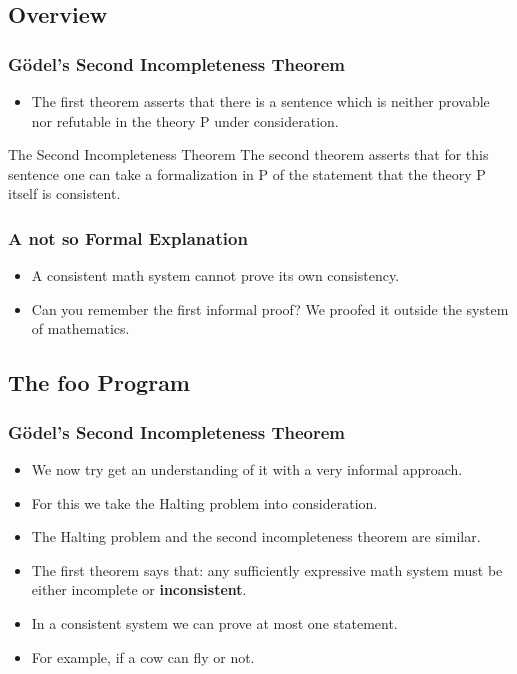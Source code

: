 \documentclass[aspectratio=169]{beamer}
\begin{document}
\subsection{Overview}
\begin{frame}
	\frametitle{Gödel's Second Incompleteness Theorem}
	\begin{itemize}
		\item The first theorem asserts that there is a sentence which is neither provable nor refutable in the theory P under consideration.
	\end{itemize}
	\begin{block}{The Second Incompleteness Theorem}
		The second theorem asserts that for this sentence one can take a formalization in P of the statement that the theory P itself is consistent.
	\end{block}

\end{frame}

\begin{frame}
	\frametitle{A not so Formal Explanation}
	\begin{itemize}
		\item A consistent math system cannot prove its own consistency.
		\item Can you remember the first informal proof? We proofed it outside the system of mathematics.
		\hyperlink{important}{}
	\end{itemize}
\end{frame}

\subsection{The foo Program}
\begin{frame}
	\frametitle{Gödel's Second Incompleteness Theorem}
	\begin{itemize}
		\item We now try get an understanding of it with a very informal approach.
		\item For this we take the Halting problem into consideration.
		\item The Halting problem and the second incompleteness theorem are similar.
		\item The first theorem says that: any sufficiently expressive math system must be either incomplete or \textbf{inconsistent}.
		\item In a consistent system we can prove at most one statement. 
		\item [] For example, if a cow can fly or not.
	\end{itemize}
\end{frame}
\end{document}
